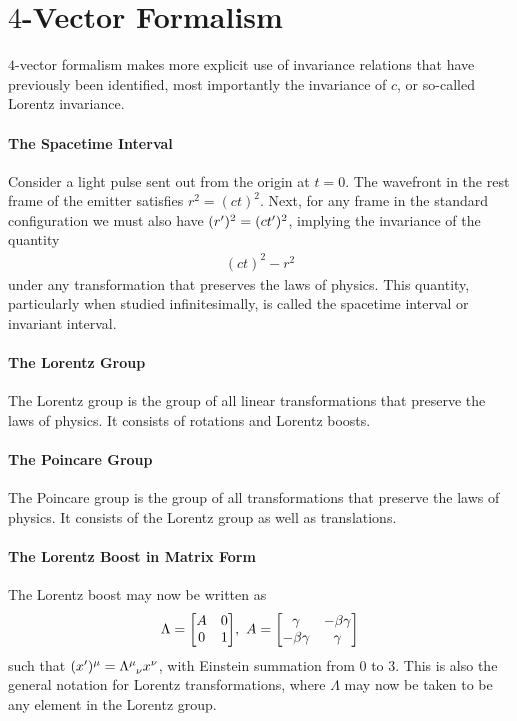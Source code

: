 \section{$4$-Vector Formalism}

$4$-vector formalism makes more explicit use of invariance relations that have previously been identified, most importantly the invariance of $c$, or so-called Lorentz invariance.

\paragraph{The Spacetime Interval}
Consider a light pulse sent out from the origin at $t = 0$. The wavefront in the rest frame of the emitter satisfies $r^{2} = (ct)^{2}$. Next, for any frame in the standard configuration we must also have $(r^{\prime})^{2} = (ct^{\prime})^{2}$, implying the invariance of the quantity
\begin{align*}
	(ct)^{2} - r^{2}
\end{align*}
under any transformation that preserves the laws of physics. This quantity, particularly when studied infinitesimally, is called the spacetime interval or invariant interval.

\paragraph{The Lorentz Group}
The Lorentz group is the group of all linear transformations that preserve the laws of physics. It consists of rotations and Lorentz boosts.

\paragraph{The Poincare Group}
The Poincare group is the group of all transformations that preserve the laws of physics. It consists of the Lorentz group as well as translations.

\paragraph{The Lorentz Boost in Matrix Form}
The Lorentz boost may now be written as
\begin{align*}
	\Lambda =
	\mqty[
		A & 0 \\
		0 & 1
	],\ 
	A =
	\mqty[
		\gamma       & -\beta\gamma \\
		-\beta\gamma & \gamma
	]
\end{align*}
such that $(x\p)^{\mu} = \tensor{\Lambda}{^{\mu}_{\nu}}x^{\nu}$, with Einstein summation from $0$ to $3$. This is also the general notation for Lorentz transformations, where $\Lambda$ may now be taken to be any element in the Lorentz group.

